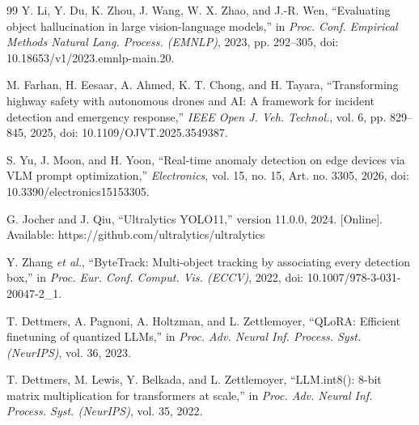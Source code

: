 \begin{thebibliography}{99}
Y. Li, Y. Du, K. Zhou, J. Wang, W. X. Zhao, and J.-R. Wen, ``Evaluating object hallucination in large vision-language models,'' in \textit{Proc. Conf. Empirical Methods Natural Lang. Process. (EMNLP)}, 2023, pp. 292--305, doi: 10.18653/v1/2023.emnlp-main.20.

M. Farhan, H. Eesaar, A. Ahmed, K. T. Chong, and H. Tayara, ``Transforming highway safety with autonomous drones and AI: A framework for incident detection and emergency response,'' \textit{IEEE Open J. Veh. Technol.}, vol. 6, pp. 829--845, 2025, doi: 10.1109/OJVT.2025.3549387.

S. Yu, J. Moon, and H. Yoon, ``Real-time anomaly detection on edge devices via VLM prompt optimization,'' \textit{Electronics}, vol. 15, no. 15, Art. no. 3305, 2026, doi: 10.3390/electronics15153305.

G. Jocher and J. Qiu, ``Ultralytics YOLO11,'' version 11.0.0, 2024. [Online]. Available: https://github.com/ultralytics/ultralytics

Y. Zhang \textit{et al.}, ``ByteTrack: Multi-object tracking by associating every detection box,'' in \textit{Proc. Eur. Conf. Comput. Vis. (ECCV)}, 2022, doi: 10.1007/978-3-031-20047-2\_1.

T. Dettmers, A. Pagnoni, A. Holtzman, and L. Zettlemoyer, ``QLoRA: Efficient finetuning of quantized LLMs,'' in \textit{Proc. Adv. Neural Inf. Process. Syst. (NeurIPS)}, vol. 36, 2023.

T. Dettmers, M. Lewis, Y. Belkada, and L. Zettlemoyer, ``LLM.int8(): 8-bit matrix multiplication for transformers at scale,'' in \textit{Proc. Adv. Neural Inf. Process. Syst. (NeurIPS)}, vol. 35, 2022.

\end{thebibliography}
